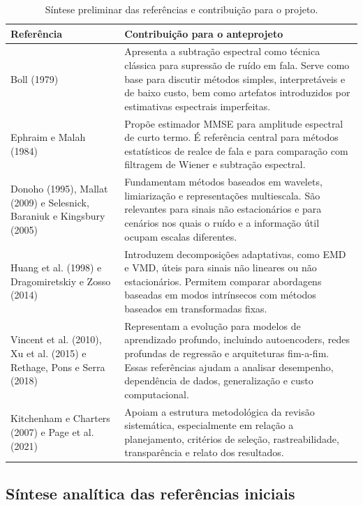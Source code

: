 \begin{table}[!htbp]
\centering
\caption{Síntese preliminar das referências e contribuição para o projeto.}
\begin{tabularx}{\textwidth}{>{\raggedright\arraybackslash}p{3.8cm}X}
\toprule
\textbf{Referência} & \textbf{Contribuição para o anteprojeto} \\
\midrule
Boll (1979) & Apresenta a subtração espectral como técnica clássica para supressão de ruído em fala. Serve como base para discutir métodos simples, interpretáveis e de baixo custo, bem como artefatos introduzidos por estimativas espectrais imperfeitas. \\
\addlinespace
Ephraim e Malah (1984) & Propõe estimador MMSE para amplitude espectral de curto termo. É referência central para métodos estatísticos de realce de fala e para comparação com filtragem de Wiener e subtração espectral. \\
\addlinespace
Donoho (1995), Mallat (2009) e Selesnick, Baraniuk e Kingsbury (2005) & Fundamentam métodos baseados em wavelets, limiarização e representações multiescala. São relevantes para sinais não estacionários e para cenários nos quais o ruído e a informação útil ocupam escalas diferentes. \\
\addlinespace
Huang et al. (1998) e Dragomiretskiy e Zosso (2014) & Introduzem decomposições adaptativas, como EMD e VMD, úteis para sinais não lineares ou não estacionários. Permitem comparar abordagens baseadas em modos intrínsecos com métodos baseados em transformadas fixas. \\
\addlinespace
Vincent et al. (2010), Xu et al. (2015) e Rethage, Pons e Serra (2018) & Representam a evolução para modelos de aprendizado profundo, incluindo autoencoders, redes profundas de regressão e arquiteturas fim-a-fim. Essas referências ajudam a analisar desempenho, dependência de dados, generalização e custo computacional. \\
\addlinespace
Kitchenham e Charters (2007) e Page et al. (2021) & Apoiam a estrutura metodológica da revisão sistemática, especialmente em relação a planejamento, critérios de seleção, rastreabilidade, transparência e relato dos resultados. \\
\bottomrule
\end{tabularx}
\end{table}

\newpage

\subsection{Síntese analítica das referências iniciais}

